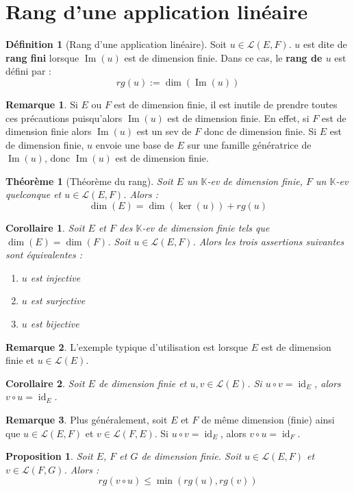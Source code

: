 \documentclass[french]{book}
\newcommand{\K}{\mathbb{K}}
\theoremstyle{plain}
\newtheorem{thm}{Théorème}[chapter]
\newtheorem{prop}{Proposition}[chapter]
\newtheorem{cor}{Corollaire}[chapter]
\theoremstyle{definition}
\newtheorem{dfn}{Définition}[chapter]
\newtheorem{rmq}{Remarque}[chapter]
\theoremstyle{remark}
\DeclareMathOperator{\id}{id}
\DeclareMathOperator{\im}{Im}
\begin{document}
\section{Rang d'une application linéaire}
\begin{dfn}[Rang d'une application linéaire]
	Soit $u\in\mathcal{L}(E,F)$. $u$ est dite de \textbf{rang fini} lorsque $\im(u)$ est de dimension finie. Dans ce cas, le \textbf{rang de $u$} est défini par : $$rg(u):=\dim\left(\im(u)\right)$$
\end{dfn}
\begin{rmq}
	Si $E$ ou $F$ est de dimension finie, il est inutile de prendre toutes ces précautions puisqu'alors $\im(u)$ est de dimension finie. En effet, si $F$ est de dimension finie alors $\im(u)$ est un sev de $F$ donc de dimension finie. Si $E$ est de dimension finie, $u$ envoie une base de $E$ sur une famille génératrice de $\im(u)$, donc $\im(u)$ est de dimension finie.
\end{rmq}
\begin{thm}[Théorème du rang]
	Soit $E$ un $\K$-ev de dimension finie, $F$ un $\K$-ev quelconque et $u\in\mathcal{L}(E,F)$. Alors : $$\dim(E)=\dim(\ker(u))+rg(u)$$
\end{thm}
\begin{cor}
	Soit $E$ et $F$ des $\K$-ev de dimension finie tels que $\dim(E)=\dim(F)$. Soit $u\in\mathcal{L}(E,F)$. Alors les trois assertions suivantes sont équivalentes :\begin{enumerate}
		\item $u$ est injective
		\item $u$ est surjective
		\item $u$ est bijective
	\end{enumerate}
\end{cor}
\begin{rmq}
	L'exemple typique d'utilisation est lorsque $E$ est de dimension finie et $u\in\mathcal{L}(E)$.
\end{rmq}
\begin{cor}
	Soit $E$ de dimension finie et $u,v\in\mathcal{L}(E)$. Si $u\circ v=\id_E$, alors $v\circ u=\id_E$.
\end{cor}
\begin{rmq}
	Plus généralement, soit $E$ et $F$ de même dimension (finie) ainsi que $u\in\mathcal{L}(E,F)$ et $v\in\mathcal{L}(F,E)$. Si $u\circ v=\id_E$, alors $v\circ u=\id_F$.
\end{rmq}
\begin{prop}
	Soit $E$, $F$ et $G$ de dimension finie. Soit $u\in\mathcal{L}(E,F)$ et $v\in\mathcal{L}(F,G)$. Alors : $$rg(v\circ u)\leqslant\min(rg(u),rg(v))$$
\end{prop}
\end{document}

